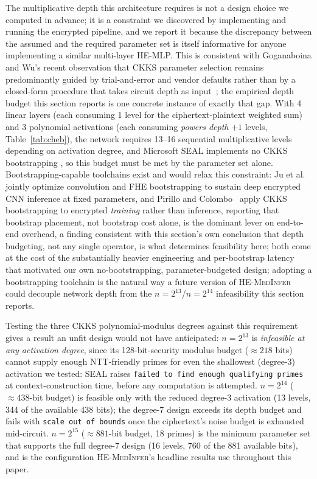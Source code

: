 \documentclass[journal,compsoc]{IEEEtran}
\newcommand{\framework}{\textsc{HE-MedInfer}}
\begin{document}
The multiplicative depth this architecture requires is not a design choice we
computed in advance; it is a constraint we discovered by implementing and
running the encrypted pipeline, and we report it because the discrepancy
between the assumed and the required parameter set is itself informative for
anyone implementing a similar multi-layer HE-MLP. This is consistent with
Goganaboina and Wu's recent observation that CKKS parameter selection remains
predominantly guided by trial-and-error and vendor defaults rather than by a
closed-form procedure that takes circuit depth as
input~\cite{goganaboina2026ckksparams}; the empirical depth budget this
section reports is one concrete instance of exactly that gap. With 4 linear layers (each
consuming 1 level for the ciphertext-plaintext weighted sum) and 3 polynomial
activations (each consuming \emph{powers depth} $+1$ levels, Table~\ref{tab:cheb}),
the network requires 13--16 sequential multiplicative levels depending on
activation degree, and Microsoft SEAL implements no CKKS bootstrapping
\cite{cheon2018bootstrapping}, so
this budget must be met by the parameter set alone. Bootstrapping-capable
toolchains exist and would relax this constraint: Ju et
al.~\cite{ju2024neujeans} jointly optimize convolution and FHE bootstrapping
to sustain deep encrypted CNN inference at fixed parameters, and Pirillo and
Colombo~\cite{pirillo2026reboot} apply CKKS bootstrapping to encrypted
\emph{training} rather than inference, reporting that bootstrap placement,
not bootstrap cost alone, is the dominant lever on end-to-end overhead, a
finding consistent with this section's own conclusion that depth budgeting,
not any single operator, is what determines feasibility here; both come at
the cost of the substantially heavier engineering and per-bootstrap latency
that motivated our own no-bootstrapping, parameter-budgeted design; adopting a
bootstrapping toolchain is the natural way a future version of \framework{}
could decouple network depth from the $n=2^{13}$/$n=2^{14}$ infeasibility
this section reports.

Testing the three CKKS polynomial-modulus degrees against this requirement
gives a result an unfit design would not have anticipated: $n=2^{13}$ is
\emph{infeasible at any activation degree}, since its 128-bit-security modulus
budget ($\approx 218$ bits) cannot supply enough NTT-friendly primes for even
the shallowest (degree-3) activation we tested: SEAL raises \texttt{failed
to find enough qualifying primes} at context-construction time, before any
computation is attempted. $n=2^{14}$ ($\approx 438$-bit budget) is feasible
only with the reduced degree-3 activation (13 levels, 344 of the available
438 bits); the degree-7 design exceeds its depth budget and fails with
\texttt{scale out of bounds} once the ciphertext's noise budget is exhausted
mid-circuit. $n=2^{15}$ ($\approx 881$-bit budget, 18 primes) is the minimum
parameter set that supports the full degree-7 design (16 levels, 760 of the
881 available bits), and is the configuration \framework{}'s headline results
use throughout this paper.
\end{document}

